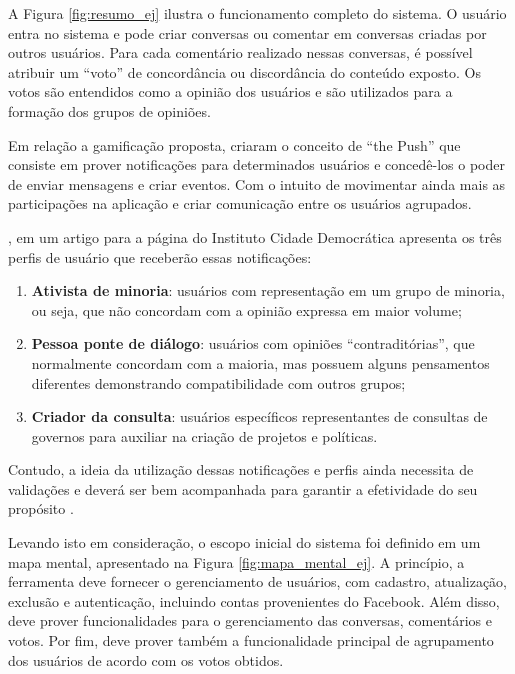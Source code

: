 A Figura \ref{fig:resumo_ej} ilustra o funcionamento completo do sistema. O usuário entra no sistema e pode criar conversas ou
comentar em conversas criadas por outros usuários. Para cada comentário realizado nessas conversas, é possível atribuir um 
``voto'' de concordância ou discordância do conteúdo exposto. Os votos são entendidos como a opinião dos usuários e são
utilizados para a formação dos grupos de opiniões. 

Em relação a gamificação proposta,  criaram o conceito de ``the Push'' que consiste
em prover notificações para determinados usuários e concedê-los o poder de enviar mensagens e criar eventos. Com 
o intuito de movimentar ainda mais as participações na aplicação e criar comunicação entre os usuários agrupados.

, em um artigo para a página do Instituto Cidade Democrática apresenta os três perfis de usuário
que receberão essas notificações:

\begin{enumerate}
  \item \textbf{Ativista de minoria}: usuários com representação em um grupo de minoria, ou seja, que não concordam com a opinião 
    expressa em maior volume;
  \item \textbf{Pessoa ponte de diálogo}: usuários com opiniões ``contraditórias'', que normalmente concordam com a maioria, mas
    possuem alguns pensamentos diferentes demonstrando compatibilidade com outros grupos;
  \item \textbf{Criador da consulta}: usuários específicos representantes de consultas de governos para auxiliar na criação de projetos
  e políticas.
\end{enumerate}


Contudo, a ideia da utilização dessas notificações e perfis ainda necessita de validações e deverá ser bem
acompanhada para garantir a efetividade do seu propósito \cite{empurrandojuntos, parra}. 

Levando isto em consideração, o escopo inicial do sistema foi definido em um mapa mental, apresentado na Figura \ref{fig:mapa_mental_ej}. 
A princípio, a ferramenta deve fornecer o gerenciamento de usuários, com cadastro, atualização, exclusão e autenticação, 
incluindo contas provenientes do Facebook. Além disso, deve prover funcionalidades para o gerenciamento das conversas, comentários
e votos. Por fim, deve prover também a funcionalidade principal de agrupamento dos usuários de acordo com os votos obtidos.

